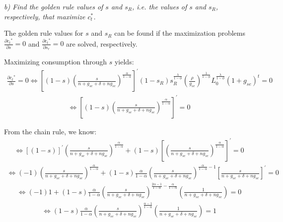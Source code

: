 \documentclass[11pt]{article} %
\begin{document}
\pagebreak
\textit{b) Find the golden rule values of $s$ and $s_R$, i.e. the values of $s$ and $s_R$, respectively, that maximize $c_t^*$.}\par 

The golden rule values for $s$ and $s_R$ can be found if the maximization problems $\frac{\partial{c_t}^*}{\partial{s}}=0$ and $\frac{\partial{c_t}^*}{\partial{s_r}}=0$ are solved, respectively.

\par Maximizing consumption through $s$ yields:
\begin{align*}
    \frac{\partial{c_t}^*}{\partial{s}} = 0
    \Longleftrightarrow \left[(1-s)\left(\frac{s}{n+g_{se}+\delta+ng_{se}}\right)^{\frac{\alpha}{1-\alpha}}\right]^{'}(1-s_{R})s_R^{\frac{\lambda}{1-\phi}}\left(\frac{\rho}{g_{se}} \right)^{\frac{1}{1-\phi}}L_0^{\frac{\lambda}{1-\phi}}(1+g_{se})^t=0
\end{align*}
\begin{align*}
    \Longleftrightarrow \left[(1-s)\left(\frac{s}{n+g_{se}+\delta+ng_{se}}\right)^{\frac{\alpha}{1-\alpha}}\right]^{'}=0 
\end{align*}

\par From the chain rule, we know:
\begin{align*}
    \Longleftrightarrow 
    \left[(1-s)\right]^{'}\left(\frac{s}{n+g_{se}+\delta+ng_{se}}\right)^{\frac{\alpha}{1-\alpha}}
    +(1-s)\left[\left(\frac{s}{n+g_{se}+\delta+ng_{se}}\right)^{\frac{\alpha}{1-\alpha}}\right]^{'}
    =0
\end{align*}
\begin{align*}
    \Longleftrightarrow
    (-1) \left(\frac{s}{n+g_{se}+\delta+ng_{se}}\right)^{\frac{\alpha}{1-\alpha}}
    + (1-s) \frac{\alpha}{1-\alpha}\left(\frac{s}{n+g_{se}+\delta+ng_{se}}\right)^{\frac{\alpha}{1-\alpha}-1}\left[\frac{s}{n+g_{se}+\delta+ng_{se}}\right]^{'}
    =0
\end{align*}
\begin{align*}
    \Longleftrightarrow
    (-1)1
    + (1-s) \frac{\alpha}{1-\alpha}\left(\frac{s}{n+g_{se}+\delta+ng_{se}}\right)^{\frac{2\alpha-1}{1-\alpha}-\frac{\alpha}{1-\alpha}}\left(\frac{1}{n+g_{se}+\delta+ng_{se}}\right)
    =0
\end{align*}
\begin{align*}
    \Longleftrightarrow
    (1-s) \frac{\alpha}{1-\alpha}\left(\frac{s}{n+g_{se}+\delta+ng_{se}}\right)^{\frac{\alpha-1}{1-\alpha}}
    \left(\frac{1}{n+g_{se}+\delta+ng_{se}}\right)
    =1
\end{align*}
\end{document}
